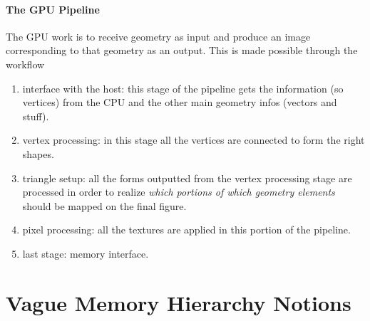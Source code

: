 \documentclass[10pt,a4paper]{article}
\begin{document}
			\subsection{The GPU Pipeline}
				The GPU work is to receive geometry as input and produce an image corresponding to that geometry as an output. This is made possible through the workflow
				\begin{enumerate}
					\item interface with the host: this stage of the pipeline gets the information (so vertices) from the CPU and the other main geometry infos (vectors and stuff).
					\item vertex processing: in this stage all the vertices are connected to form the right shapes. 
					\item triangle setup: all the forms outputted from the vertex processing stage are processed in order to realize \emph{which portions of which geometry elements} should be mapped on the final figure.
					\item pixel processing: all the textures are applied in this portion of the pipeline.
					\item last stage: memory interface. 
				\end{enumerate}
				
	\clearpage \part{Vague Memory Hierarchy Notions}
\end{document}
